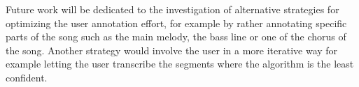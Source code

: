 \documentclass{article}
\begin{document}
Future work will be dedicated to the investigation of alternative strategies for optimizing the user annotation effort, for example by rather annotating specific parts of the song such as the main melody, the bass line or one of the chorus of the song. Another strategy would involve the user in a more iterative way for example letting the user transcribe the segments where the algorithm is the least confident.  





\end{document}
